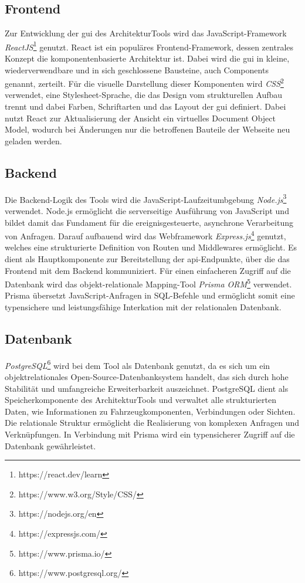 \subsection*{Frontend}

Zur Entwicklung der \gls{gui} des ArchitekturTools wird das JavaScript-Framework \textit{ReactJS}\footnote{https://react.dev/learn} genutzt. React ist ein populäres Frontend-Framework, dessen zentrales Konzept die komponentenbasierte Architektur ist. Dabei wird die \gls{gui} in kleine, wiederverwendbare und in sich geschlossene Bausteine, auch Components genannt, zerteilt. Für die visuelle Darstellung dieser Komponenten wird \textit{CSS}\footnote{https://www.w3.org/Style/CSS/} verwendet, eine Stylesheet-Sprache, die das Design vom strukturellen Aufbau trennt und dabei Farben, Schriftarten und das Layout der \gls{gui} definiert. Dabei nutzt React zur Aktualisierung der Ansicht ein virtuelles Document Object Model, wodurch bei Änderungen nur die betroffenen Bauteile der Webseite neu geladen werden.

\subsection*{Backend}

Die Backend-Logik des Tools wird die JavaScript-Laufzeitumbgebung \textit{Node.js}\footnote{https://nodejs.org/en} verwendet. Node.js ermöglicht die serverseitige Ausführung von JavaScript und bildet damit das Fundament für die ereignisgesteuerte, asynchrone Verarbeitung von Anfragen. Darauf aufbauend wird das Webframework \textit{Express.js}\footnote{https://expressjs.com/} genutzt, welches eine strukturierte Definition von Routen und Middlewares ermöglicht. Es dient als Hauptkomponente zur Bereitstellung der \gls{api}-Endpunkte, über die das Frontend mit dem Backend kommuniziert. Für einen einfacheren Zugriff auf die Datenbank wird das objekt-relationale Mapping-Tool \textit{Prisma ORM}\footnote{https://www.prisma.io/} verwendet. Prisma übersetzt JavaScript-Anfragen in SQL-Befehle und ermöglicht somit eine typensichere und leistungsfähige Interkation mit der relationalen Datenbank.


\subsection*{Datenbank}

\textit{PostgreSQL}\footnote{https://www.postgresql.org/} wird bei dem Tool als Datenbank genutzt, da es sich um ein objektrelationales Open-Source-Datenbanksystem handelt, das sich durch hohe Stabilität und umfangreiche Erweiterbarkeit auszeichnet. PostgreSQL dient als Speicherkomponente des ArchitekturTools und verwaltet alle strukturierten Daten, wie Informationen zu Fahrzeugkomponenten, Verbindungen oder Sichten. Die relationale Struktur ermöglicht die Realisierung von komplexen Anfragen und Verknüpfungen. In Verbindung mit Prisma wird ein typensicherer Zugriff auf die Datenbank gewährleistet.